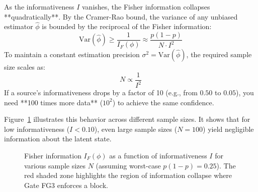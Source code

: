 \documentclass[11pt,a4paper]{article}
\begin{document}
As the informativeness $I$ vanishes, the Fisher information collapses **quadratically**. By the Cramer-Rao bound, the variance of any unbiased estimator $\hat{\phi}$ is bounded by the reciprocal of the Fisher information:
\[
\text{Var}(\hat{\phi}) \ge \frac{1}{I_F(\phi)} \approx \frac{p(1-p)}{N \cdot I^2}
\]
To maintain a constant estimation precision $\sigma^2 = \text{Var}(\hat{\phi})$, the required sample size scales as:
\[
N \propto \frac{1}{I^2}
\]
If a source's informativeness drops by a factor of 10 (e.g., from $0.50$ to $0.05$), you need **100 times more data** ($10^2$) to achieve the same confidence. 

Figure~\ref{fig:info_scaling} illustrates this behavior across different sample sizes. It shows that for low informativeness ($I < 0.10$), even large sample sizes ($N = 100$) yield negligible information about the latent state.

\begin{figure}[htbp]
\centering
{}
\caption{Fisher information $I_F(\phi)$ as a function of informativeness $I$ for various sample sizes $N$ (assuming worst-case $p(1-p)=0.25$). The red shaded zone highlights the region of information collapse where Gate FG3 enforces a block.}
\label{fig:info_scaling}
\end{figure}
\end{document}
